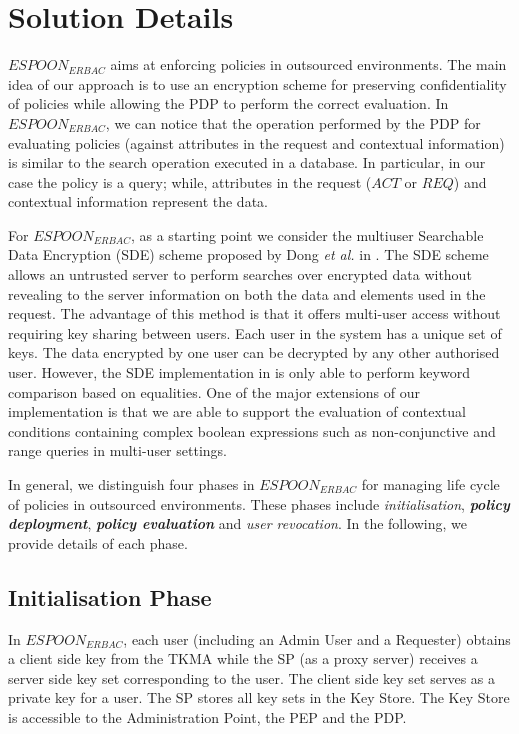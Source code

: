 \documentclass[final,5p,times,twocolumn]{elsarticle}
\begin{document}
\section{Solution Details}
\label{sec:solution-details}

$\mathit{ESPOON_{ERBAC}}$ aims at enforcing policies in outsourced environments. The main idea of our approach is to use an encryption scheme for preserving confidentiality of policies while allowing the PDP to perform the correct evaluation. In $\mathit{ESPOON_{ERBAC}}$, we can notice that the operation performed by the PDP for evaluating policies (against attributes in the request and contextual information) is similar to the search operation executed in a database. In particular, in our case the policy is a query; while, attributes in the request ($\mathit{ACT}$ or $\mathit{REQ}$) and contextual information represent the data.

For $\mathit{ESPOON_{ERBAC}}$, as a starting point we consider the multiuser Searchable Data Encryption (SDE) scheme proposed by Dong \emph{et al.} in \cite{Dong2011}. The SDE scheme allows an untrusted server to perform searches over encrypted data without revealing to the server information on both the data and elements used in the request. The advantage of this method is that it offers multi-user access without requiring key sharing between users. Each user in the system has a unique set of keys. The data encrypted by one user can be decrypted by any other authorised user. However, the SDE implementation in \cite{Dong2011} is only able to perform keyword comparison based on equalities. One of the major extensions of our implementation is that we are able to support the evaluation of contextual conditions containing complex boolean expressions such as non-conjunctive and range queries in multi-user settings.

In general, we distinguish four phases in $\mathit{ESPOON_{ERBAC}}$ for managing life cycle of policies in outsourced environments. These phases include \emph{initialisation}, \emph{\textbf{policy deployment}}, \emph{\textbf{policy evaluation}} and \emph{user revocation}. In the following, we provide details of each phase.


\subsection{Initialisation Phase}

In $\mathit{ESPOON_{ERBAC}}$, each user (including an Admin User and a Requester) obtains a client side key from the TKMA while the SP (as a proxy server) receives a server side key set corresponding to the user. The client side key set serves as a private key for a user. The SP stores all key sets in the Key Store. The Key Store is accessible to the Administration Point, the PEP and the PDP.
\end{document}
